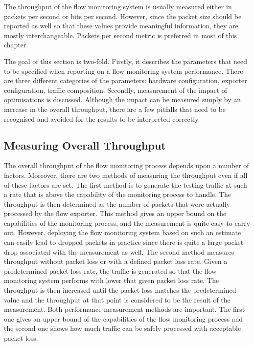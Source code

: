 The throughput of the flow monitoring system is usually measured either in packets per second or bits per second. However, since the packet size should be reported as well so that these values provide meaningful information, they are mostly interchangeable. Packets per second metric is preferred in most of this chapter.

The goal of this section is two-fold. Firstly, it describes the parameters that need to be specified when reporting on a flow monitoring system performance. There are three different categories of the parameters: hardware configuration, exporter configuration, traffic composition. Secondly, measurement of the impact of optimisations is discussed. Although the impact can be measured simply by an increase in the overall throughput, there are a few pitfalls that need to be recognised and avoided for the results to be interpreted correctly.


\subsection{Measuring Overall Throughput}

The overall throughput of the flow monitoring process depends upon a number of factors. Moreover, there are two methods of measuring the throughput even if all of these factors are set. The first method is to generate the testing traffic at such a rate that is above the capability of the monitoring process to handle. The throughput is then determined as the number of packets that were actually processed by the flow exporter. This method gives an upper bound on the capabilities of the monitoring process, and the measurement is quite easy to carry out. However, deploying the flow monitoring system based on such an estimate can easily lead to dropped packets in practice since there is quite a large packet drop associated with the measurement as well. The second method measures throughput without packet loss or with a defined packet loss rate. Given a predetermined packet loss rate, the traffic is generated so that the flow monitoring system performs with lower that given packet loss rate. The throughput is then increased until the packet loss matches the predetermined value and the throughput at that point is considered to be the result of the measurement. Both performance measurement methods are important. The first one gives an upper bound of the capabilities of the flow monitoring process and the second one shows how much traffic can be safely processed with acceptable packet loss.

